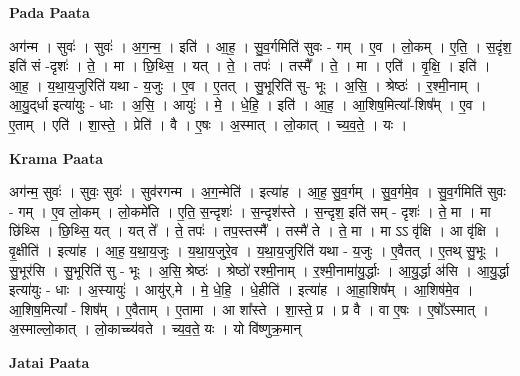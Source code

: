 \documentclass[17pt]{extarticle}
\begin{document}
\textbf{Pada Paata} \newline

अग॑न्म । सुवः॑ । सुवः॑ । अ॒ग॒न्म॒ । इति॑ । आ॒ह॒ । सु॒व॒र्गमिति॑ सुवः - गम् । ए॒व । लो॒कम् । ए॒ति॒ । स॒दृंश॒ इति॑ सं -दृशः॑ । ते॒ । मा । छि॒थ्सि॒ । यत् । ते॒ । तपः॑ । तस्मै᳚ । ते॒ । मा । एति॑ । वृ॒क्षि॒ । इति॑ । आ॒ह॒ । य॒था॒य॒जुरिति॑ यथा - य॒जुः । ए॒व । ए॒तत् । सु॒भूरिति॑ सु- भूः । अ॒सि॒ । श्रेष्ठः॑ । र॒श्मी॒नाम् । आ॒यु॒द्‌र्धा इत्या॑युः - धाः । अ॒सि॒ । आयुः॑ । मे॒ । धे॒हि॒ । इति॑ । आ॒ह॒ । आ॒शिष॒मित्या᳚-शिष᳚म् । ए॒व । ए॒ताम् । एति॑ । शा॒स्ते॒ । प्रेति॑ । वै । ए॒षः । अ॒स्मात् । लो॒कात् । च्य॒व॒ते॒ । यः ।  \newline


\textbf{Krama Paata} \newline

अग॑न्म॒ सुवः॑ । सुवः॒ सुवः॑ । सुव॑रगन्म । अ॒ग॒न्मेति॑ । इत्या॑ह । आ॒ह॒ सु॒व॒र्गम् । सु॒व॒र्गमे॒व । सु॒व॒र्गमिति॑ सुवः - गम् । ए॒व लो॒कम् । लो॒कमे॑ति । ए॒ति॒ स॒न्दृशः॑ । स॒न्दृश॑स्ते । स॒न्दृश॒ इति॑ सम् - दृशः॑ । ते॒ मा । मा छि॑थ्सि । छि॒थ्सि॒ यत् । यत् ते᳚ । ते॒ तपः॑ । तप॒स्तस्मै᳚ । तस्मै॑ ते । ते॒ मा । मा ऽऽ वृ॑क्षि । आ वृ॑क्षि । वृ॒क्षीति॑ । इत्या॑ह । आ॒ह॒ य॒था॒य॒जुः । य॒था॒य॒जुरे॒व । य॒था॒य॒जुरिति॑ यथा - य॒जुः । ए॒वैतत् । ए॒तथ् सु॒भूः । सु॒भूर॑सि । सु॒भूरिति॑ सु - भूः । अ॒सि॒ श्रेष्ठः॑ । श्रेष्ठो॑ रश्मी॒नाम् । र॒श्मी॒नामा॑यु॒र्द्धाः । आ॒यु॒र्द्धा अ॑सि । आ॒यु॒र्द्धा इत्या॑युः - धाः । अ॒स्यायुः॑ । आयु॑र्,मे । मे॒ धे॒हि॒ । धे॒हीति॑ । इत्या॑ह । आ॒हा॒शिष᳚म् । आ॒शिष॑मे॒व । आ॒शिष॒मित्या᳚ - शिष᳚म् । ए॒वैताम् । ए॒तामा । आ शा᳚स्ते । शा॒स्ते॒ प्र । प्र वै । वा ए॒षः । ए॒षो᳚ऽस्मात् । अ॒स्माल्लो॒कात् । लो॒काच्च्य॑वते । च्य॒व॒ते॒ यः । यो वि॑ष्णुक्र॒मान् \newline

\textbf{Jatai Paata} \newline
\end{document}
